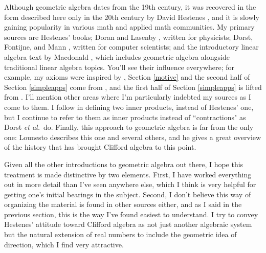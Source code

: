 \documentclass{utarticle}
\begin{document}
Although geometric algebra dates from the 19th century, it was recovered in the form
described here only in the 20th century by David Hestenes \cite{STA,CAtoGC,NewFounds}, 
and it is slowly gaining popularity in various math and applied math communities.  
My primary sources are Hestenes' books; Doran and Lasenby \cite{GAforphys}, written 
for physicists; Dorst, Fontijne, and Mann \cite{GAforCS}, written for computer scientists; 
and the introductory linear algebra text by Macdonald \cite{LandGA}, which includes 
geometric algebra alongside traditional linear algebra topics.  You'll see 
their influence everywhere; for example, my axioms were inspired by \cite{CAtoGC}, 
Section \ref{motive} and the second half of Section \ref{simpleapps} come from 
\cite{GAforphys}, and the first half of Section \ref{simpleapps} is lifted from \cite{GAforCS}.
I'll mention other areas where I'm particularly indebted my sources as I come to them.
I follow \cite{GAforCS} in defining two inner products, instead of Hestenes' one, but I 
continue to refer to them as inner products instead of ``contractions" as Dorst \textit{et al.}\ 
do.   Finally, this approach to geometric algebra is far from the only one: Lounesto 
\cite{CAS} describes this one and several others, and he gives a great overview of the 
history that has brought Clifford algebra to this point.

Given all the other introductions to geometric algebra out there, I hope this treatment is
made distinctive by two elements.  First, I have worked everything out in more detail than 
I've seen anywhere else, which I think is very helpful for getting one's initial bearings in 
the subject.  Second, I don't believe this way of organizing the material is found in other 
sources either, and as I said in the previous section, this is the way I've found easiest to 
understand.  I try to convey Hestenes' attitude toward Clifford algebra as not just another 
algebraic system but the natural extension of real numbers to include the geometric idea 
of direction, which I find very attractive.
\end{document}
